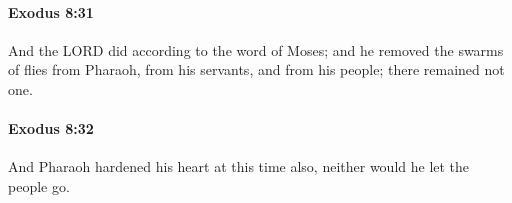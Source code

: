 		\paragraph{Exodus 8:31} %
			\label{EXODUS-8-31}

			And the LORD did according to the word of Moses; and he removed the swarms of flies from Pharaoh, from his servants, and from his people; there remained not one.


		\paragraph{Exodus 8:32} %
			\label{EXODUS-8-32}

			And Pharaoh hardened his heart at this time also, neither would he let the people go.

